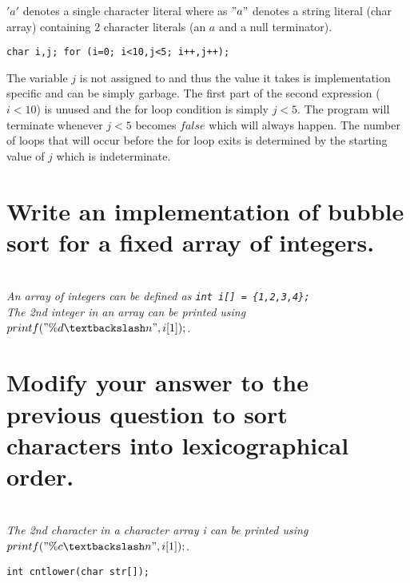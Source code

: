 \documentclass{supervision}
\begin{document}
\begin{questions}
    \begin{solution}
    $'a'$ denotes a single character literal where as $"a"$ denotes a string literal (char array) containing 2 character literals (an $a$ and a null terminator).
    \end{solution}

\begin{lstlisting}
char i,j; for (i=0; i<10,j<5; i++,j++);
\end{lstlisting}
    \begin{solution}
    The variable $j$ is not assigned to and thus the value it takes is implementation specific and can be simply garbage. The first part of the second expression ($i<10$) is unused and the for loop condition is simply $j<5$. The program will terminate whenever $j<5$ becomes $false$ which will always happen. The number of loops that will occur before the for loop exits is determined by the starting value of $j$ which is indeterminate.
    \end{solution}

    \question{}
    \begin{parts}

        \part{Write an implementation of bubble sort for a fixed array of integers.}
        \\
        \textit{An array of integers can be defined as \lstinline|int i[] = {1,2,3,4};| \\ The 2nd integer in an array can be printed using $printf("\%d \textbackslash n",i[1]);$.}
        \begin{solution}
            
        \end{solution}


        \part{Modify your answer to the previous question to sort characters into lexicographical order.}
        \\
        \textit{The 2nd character in a character array i can be printed using $printf("\%c\textbackslash n",i[1]);$.}
        \begin{solution}
            
        \end{solution}
    \end{parts}
\begin{lstlisting}
int cntlower(char str[]);
\end{lstlisting}


\end{questions}
\end{document}

